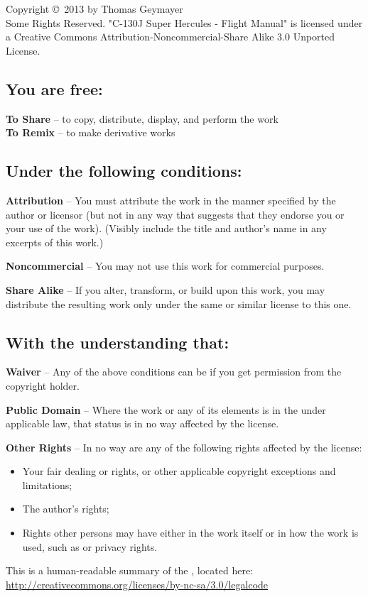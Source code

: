 \sffamily
{
Copyright \copyright~2013 by Thomas Geymayer\\
Some Rights Reserved. "C-130J Super Hercules - Flight Manual" is licensed under a Creative Commons Attribution-Noncommercial-Share Alike 3.0 Unported License.

\subsection*{You are free:}

\textbf{To Share} -- to copy, distribute, display, and perform the work\\
\textbf{To Remix} -- to make derivative works

\subsection*{Under the following conditions:}

\textbf{Attribution} -- You must attribute the work in the manner specified by the author or licensor (but not in any way that suggests that they endorse you or your use of the work). (Visibly include the title and author's name in any excerpts of this work.)

\textbf{Noncommercial} -- You may not use this work for commercial purposes.

\textbf{Share Alike} -- If you alter, transform, or build upon this work, you may distribute the resulting work only under the same or similar license to this one.

\subsection*{With the understanding that:}

\textbf{Waiver} -- Any of the above conditions can be  if you get permission from the copyright holder.

\textbf{Public Domain} -- Where the work or any of its elements is in the  under applicable law, that status is in no way affected by the license.

\textbf{Other Rights} -- In no way are any of the following rights affected by the license:
\begin{itemize}
  \item Your fair dealing or  rights, or other applicable copyright exceptions and limitations;
  \item The author's  rights;
  \item Rights other persons may have either in the work itself or in how the work is used, such as  or privacy rights.
\end{itemize}

This is a human-readable summary of the , located here:\\
\url{http://creativecommons.org/licenses/by-nc-sa/3.0/legalcode}
}
